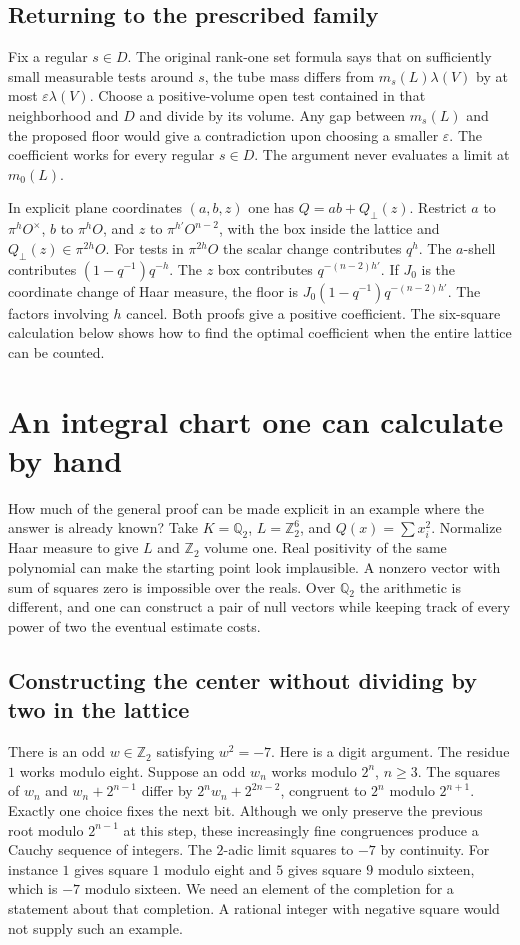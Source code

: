 \documentclass[12pt,letterpaper]{article}
\begin{document}
\subsection{Returning to the prescribed family}
Fix a regular $s\in D$. The original rank-one set formula says that on sufficiently small measurable tests around $s$, the tube mass differs from $m_s(L)\lambda(V)$ by at most $\varepsilon\lambda(V)$. Choose a positive-volume open test contained in that neighborhood and $D$ and divide by its volume. Any gap between $m_s(L)$ and the proposed floor would give a contradiction upon choosing a smaller $\varepsilon$. The coefficient works for every regular $s\in D$. The argument never evaluates a limit at $m_0(L)$.
\par
In explicit plane coordinates $(a,b,z)$ one has $Q=ab+Q_\perp(z)$. Restrict $a$ to $\pi^hO^\times$, $b$ to $\pi^hO$, and $z$ to $\pi^{h'}O^{n-2}$, with the box inside the lattice and $Q_\perp(z)\in\pi^{2h}O$. For tests in $\pi^{2h}O$ the scalar change contributes $q^h$. The $a$-shell contributes $(1-q^{-1})q^{-h}$. The $z$ box contributes $q^{-(n-2)h'}$. If $J_0$ is the coordinate change of Haar measure, the floor is $J_0(1-q^{-1})q^{-(n-2)h'}$. The factors involving $h$ cancel. Both proofs give a positive coefficient. The six-square calculation below shows how to find the optimal coefficient when the entire lattice can be counted.

\section{An integral chart one can calculate by hand}\label{sec:chart}
How much of the general proof can be made explicit in an example where the answer is already known? Take $K=\mathbb Q_2$, $L=\mathbb Z_2^6$, and $Q(x)=\sum x_i^2$. Normalize Haar measure to give $L$ and $\mathbb Z_2$ volume one. Real positivity of the same polynomial can make the starting point look implausible. A nonzero vector with sum of squares zero is impossible over the reals. Over $\mathbb Q_2$ the arithmetic is different, and one can construct a pair of null vectors while keeping track of every power of two the eventual estimate costs.

\subsection{Constructing the center without dividing by two in the lattice}
There is an odd $w\in\mathbb Z_2$ satisfying $w^2=-7$. Here is a digit argument. The residue $1$ works modulo eight. Suppose an odd $w_n$ works modulo $2^n$, $n\ge3$. The squares of $w_n$ and $w_n+2^{n-1}$ differ by $2^n w_n+2^{2n-2}$, congruent to $2^n$ modulo $2^{n+1}$. Exactly one choice fixes the next bit. Although we only preserve the previous root modulo $2^{n-1}$ at this step, these increasingly fine congruences produce a Cauchy sequence of integers. The $2$-adic limit squares to $-7$ by continuity. For instance $1$ gives square $1$ modulo eight and $5$ gives square $9$ modulo sixteen, which is $-7$ modulo sixteen. We need an element of the completion for a statement about that completion. A rational integer with negative square would not supply such an example.
\end{document}

